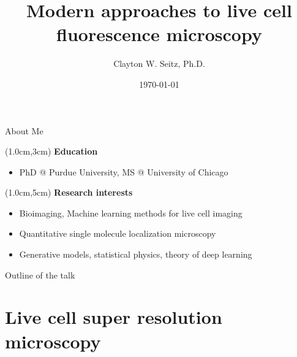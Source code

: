 \documentclass{beamer}					%
\title{Modern approaches to live cell fluorescence microscopy}	%
\author{Clayton W. Seitz, Ph.D.}								%
\date{\today}									%
\begin{document}
\begin{frame}
  \titlepage
\end{frame}


%


\begin{frame}{About Me}

\begin{textblock*}{10cm}(1.0cm,3cm)
\textbf{Education}
\begin{itemize}
\item PhD @ Purdue University, MS @ University of Chicago
\end{itemize}
\end{textblock*}

\begin{textblock*}{10cm}(1.0cm,5cm)
\textbf{Research interests}
\begin{itemize}
\item Bioimaging, Machine learning methods for live cell imaging
\item Quantitative single molecule localization microscopy 
\item Generative models, statistical physics, theory of deep learning
\end{itemize}
\end{textblock*}

\end{frame}

\begin{frame}{Outline of the talk}
    \tableofcontents
\end{frame}


\section{Live cell super resolution microscopy}
\end{document}
